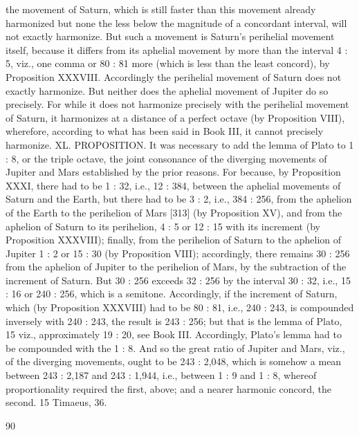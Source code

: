 \documentclass{article}
\begin{document}
the movement of Saturn, which is still faster than this movement already
harmonized but none the less below the magnitude of a concordant
interval, will not exactly harmonize. But such a movement is Saturn's
perihelial movement itself, because it differs from its aphelial movement
by more than the interval 4 : 5, viz., one comma or 80 : 81 more (which is
less than the least concord), by Proposition XXXVIII. Accordingly the
perihelial movement of Saturn does not exactly harmonize. But neither
does the aphelial movement of Jupiter do so precisely. For while it does
not harmonize precisely with the perihelial movement of Saturn, it
harmonizes at a distance of a perfect octave (by Proposition VIII),
wherefore, according to what has been said in Book III, it cannot
precisely harmonize.
XL. PROPOSITION. It was necessary to add the lemma of Plato to 1 : 8,
or the triple octave, the joint consonance of the diverging movements of
Jupiter and Mars established by the prior reasons.
For because, by Proposition XXXI, there had to be 1 : 32, i.e., 12 : 384,
between the aphelial movements of Saturn and the Earth, but there had
to be 3 : 2, i.e., 384 : 256, from the aphelion of the Earth to the
perihelion of Mars [313] (by Proposition XV), and from the aphelion of
Saturn to its perihelion, 4 : 5 or 12 : 15 with its increment (by Proposition
XXXVIII); finally, from the perihelion of Saturn to the aphelion of
Jupiter 1 : 2 or 15 : 30 (by Proposition VIII); accordingly, there remains
30 : 256 from the aphelion of Jupiter to the perihelion of Mars, by the
subtraction of the increment of Saturn. But 30 : 256 exceeds 32 : 256 by
the interval 30 : 32, i.e., 15 : 16 or 240 : 256, which is a semitone.
Accordingly, if the increment of Saturn, which (by Proposition XXXVIII)
had to be 80 : 81, i.e., 240 : 243, is compounded inversely with 240 :
243, the result is 243 : 256; but that is the lemma of Plato, 15 viz.,
approximately 19 : 20, see Book III. Accordingly, Plato's lemma had to be
compounded with the 1 : 8.
And so the great ratio of Jupiter and Mars, viz., of the diverging
movements, ought to be 243 : 2,048, which is somehow a mean between
243 : 2,187 and 243 : 1,944, i.e., between 1 : 9 and 1 : 8, whereof
proportionality required the first, above; and a nearer harmonic concord,
the second.
15 Timaeus, 36.


90
\end{document}

